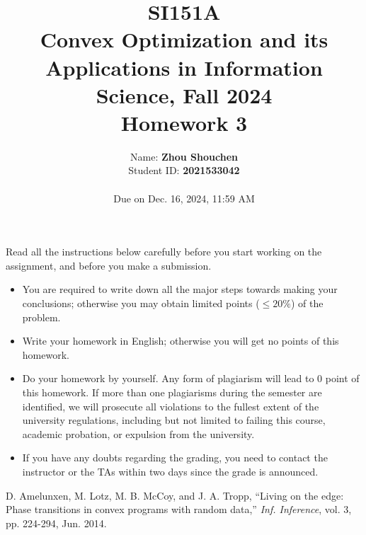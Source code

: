 \documentclass[10pt]{article}
\begin{document}
\date{
Name: \textbf{Zhou Shouchen} \\ Student ID: \textbf{2021533042} \\ \ \\
Due on Dec. 16, 2024, 11:59 AM}
\title{SI151A \\ Convex Optimization and its Applications in Information Science, Fall 2024 \\
Homework 3}
\maketitle
Read all the instructions below carefully before you start working on the assignment, and before you make a submission.
\begin{itemize}
    \item You are required to write down all the major steps towards making your conclusions; otherwise you may obtain limited points ($\leq 20\%$) of the problem.
    \item Write your homework in English; otherwise you will get no points of this homework.
    \item Do your homework by yourself. Any form of plagiarism will lead to $0$ point of this homework. If more than one plagiarisms during the semester are identified, we will prosecute all violations to the fullest extent of the university regulations, including but not limited to failing this course, academic probation, or expulsion from the university.
    \item If you have any doubts regarding the grading, you need to contact the instructor or the TAs within two days since the grade is announced.
\end{itemize}
\newpage

\begin{itemize}








\end{itemize}

\begin{thebibliography}{99}

D. Amelunxen, M. Lotz, M. B. McCoy, and J. A. Tropp,
``Living on the edge: Phase transitions in convex programs with random data,''
\textit{Inf. Inference}, vol. 3, pp. 224-294, Jun. 2014.
\end{thebibliography}
\end{document}
